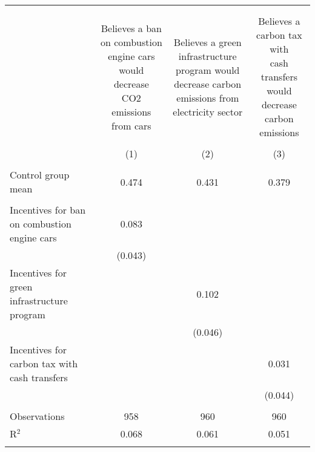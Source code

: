 
\begin{tabular}{@{\extracolsep{5pt}}lccc} 
\\[-1.8ex]\hline 
\hline \\[-1.8ex] 
\\[-1.8ex] & \makecell{Believes a ban on combustion\\engine cars would decrease\\CO2 emissions from cars} & \makecell{Believes a green infrastructure\\program would decrease carbon\\emissions from electricity sector} & \makecell{Believes a carbon tax with\\cash transfers would\\decrease carbon emissions} \\ 
\\[-1.8ex] & (1) & (2) & (3)\\ 
\hline \\[-1.8ex] 
Control group mean & 0.474 & 0.431 & 0.379  \\ \hline \\[-1.8ex]
 Incentives for ban on combustion engine cars & 0.083 &  &  \\ 
  & (0.043) &  &  \\ 
  Incentives for green infrastructure program &  & 0.102 &  \\ 
  &  & (0.046) &  \\ 
  Incentives for carbon tax with cash transfers &  &  & 0.031 \\ 
  &  &  & (0.044) \\ 
 \hline \\[-1.8ex] 

Observations & 958 & 960 & 960 \\ 
R$^{2}$ & 0.068 & 0.061 & 0.051 \\ 
\hline 
\hline \\[-1.8ex] 
\end{tabular} 